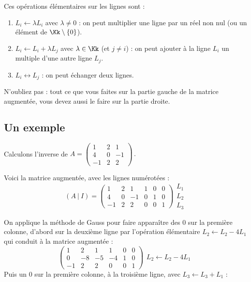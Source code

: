 \documentclass[class=report,crop=false]{standalone}
\begin{document}
\bigskip

Ces opérations élémentaires sur les lignes sont :
\begin{enumerate}
  \item $L_i \leftarrow \lambda L_i$ avec $\lambda \neq 0$ :
  on peut multiplier une ligne par un réel non nul (ou un élément de $\Kk\setminus\{0\}$).

  \item $L_i \leftarrow L_i+\lambda L_j$ avec $\lambda \in \Kk$ (et $j\neq i$) :
  on peut ajouter à la ligne $L_i$ un multiple d'une autre ligne $L_j$.

  \item $L_i \leftrightarrow L_j$ : on peut échanger deux lignes.
\end{enumerate}

\bigskip

N'oubliez pas : tout ce que vous faites sur la partie gauche de la matrice augmentée,
vous devez aussi le faire sur la partie droite.



\subsection{Un exemple}

Calculons l'inverse de
$
 A = \begin{pmatrix}
 1 & 2 & 1\\
 4 & 0 & -1\\
 -1 & 2 & 2
\end{pmatrix}\, .
$

Voici la matrice augmentée, avec les lignes numérotées :
$$(A\ |\ I) = \left(\begin{array}{ccc|ccc}
1 & 2 & 1 & 1 & 0 & 0\\
4 & 0 & -1 & 0 & 1 & 0\\
-1 & 2 & 2 & 0 & 0 & 1
\end{array}\right)
\begin{array}{l} {\scriptstyle L_1}  \\ {\scriptstyle L_2} \\  {\scriptstyle L_3}\end{array}
$$

On applique la méthode de Gauss pour faire apparaître des $0$ sur la première colonne,
d'abord sur la deuxième ligne par l'opération élémentaire
$L_2 \leftarrow L_2 - 4 L_1$ qui conduit à la matrice augmentée :
$$
\left(\begin{array}{ccc|ccc}
1 & 2 & 1 & 1 & 0 & 0\\
0 & -8 & -5 & -4 & 1 & 0\\
-1 & 2 & 2 & 0 & 0 & 1
\end{array}\right)
\begin{array}{l} ~ \\  {\scriptstyle L_2 \leftarrow L_2 - 4 L_1} \\ ~ \end{array}
$$
Puis un $0$ sur la première colonne, à la troisième ligne, avec $L_3 \leftarrow L_3 + L_1$ :
\end{document}

